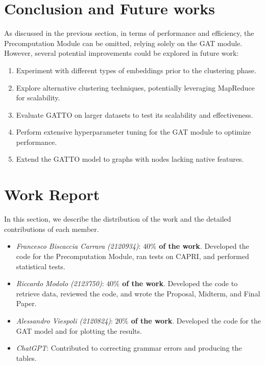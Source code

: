\documentclass[12pt,conference]{ieeeconf} %
\begin{document}
\section{Conclusion and Future works}
As discussed in the previous section, in terms of performance and efficiency, the Precomputation Module can be omitted, relying solely on the GAT module.\\
However, several potential improvements could be explored in future work:
\begin{enumerate}
\item Experiment with different types of embeddings prior to the clustering phase.
\item Explore alternative clustering techniques, potentially leveraging MapReduce for scalability.
\item Evaluate GATTO on larger datasets to test its scalability and effectiveness.
\item Perform extensive hyperparameter tuning for the GAT module to optimize performance.
\item Extend the GATTO model to graphs with nodes lacking native features.
\end{enumerate}



\clearpage
\twocolumn
\printbibliography
\clearpage
\onecolumn
\section*{Work Report}
In this section, we describe the distribution of the work and the detailed contributions of each member.
\begin{itemize}
    \item \textit{Francesco Biscaccia Carrara (2120934)}: {\textbf{$40\%$ of the work}. Developed the code for the Precomputation Module, ran tests on CAPRI, and performed statistical tests.}
    \item \textit{Riccardo Modolo (2123750)}: {\textbf{$40\%$ of the work}. Developed the code to retrieve data, reviewed the code, and wrote the Proposal, Midterm, and Final Paper.}
    \item \textit{Alessandro Viespoli (2120824)}: {\textbf{$20\%$ of the work}. Developed the code for the GAT model and for plotting the results.}
    \item \textit{ChatGPT}: {Contributed to correcting grammar errors and producing the tables.}
\end{itemize}
\end{document}
